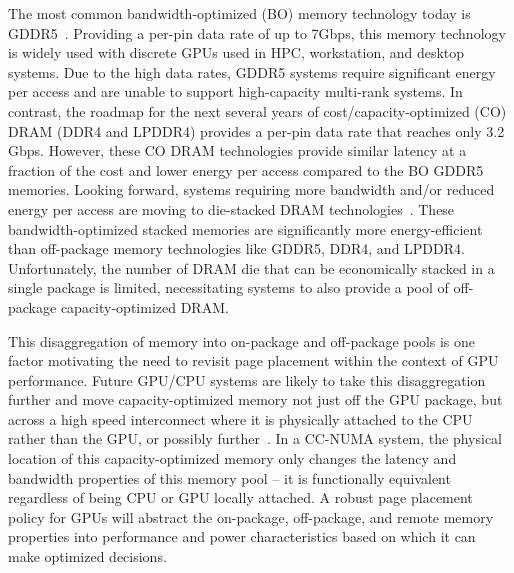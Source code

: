 The most common bandwidth-optimized (BO) memory technology today is GDDR5~\cite{GDDR5}.  Providing a per-pin
data rate of up to 7Gbps, this memory technology is widely used with discrete GPUs used in HPC,
workstation, and desktop systems.  Due to the high data rates, GDDR5 systems require significant energy per access
and are unable to support high-capacity multi-rank systems.
In contrast, the roadmap for the next several years of cost/capacity-optimized (CO) DRAM (DDR4 and LPDDR4) 
provides a per-pin data rate that reaches only 3.2 Gbps.  However, these CO DRAM technologies provide similar latency at 
a fraction of the cost and lower energy per access compared to the BO GDDR5 memories.
Looking forward, systems requiring more bandwidth and/or reduced energy per access are moving to  
die-stacked DRAM technologies~\cite{HBM,WIDEIO2}.  These bandwidth-optimized stacked memories are 
significantly more energy-efficient than off-package memory technologies like GDDR5, DDR4, and LPDDR4.  
Unfortunately, the number of DRAM die that can be economically stacked in a single package is limited, 
necessitating systems to also provide a pool of off-package capacity-optimized DRAM.

This disaggregation of memory into on-package and off-package pools is one factor motivating
the need to revisit page placement within the context of GPU performance.  Future GPU/CPU systems are 
likely to take this disaggregation further and move capacity-optimized memory not 
just off the GPU package, but across a high speed interconnect where it is physically attached to the CPU
rather than the GPU, or possibly further~\cite{Lim2009}.  
In a CC-NUMA system, the physical location of this capacity-optimized memory only changes the latency and bandwidth
properties of this memory pool -- it is functionally equivalent regardless of being CPU or GPU locally attached.  A robust
page placement policy for GPUs will abstract the on-package, off-package, and remote memory properties into
performance and power characteristics based on which it can make optimized decisions.


